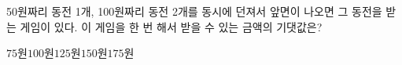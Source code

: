 50원짜리 동전 1개, 100원짜리 동전 2개를 동시에 던져서 앞면이 나오면 그 동전을 받는 게임이 있다. 이 게임을 한 번 해서 받을 수 있는 금액의 기댓값은?
\begin{choices32}{$75$원}{$100$원}{$125$원}{$150$원}{$175$원}\end{choices32}
